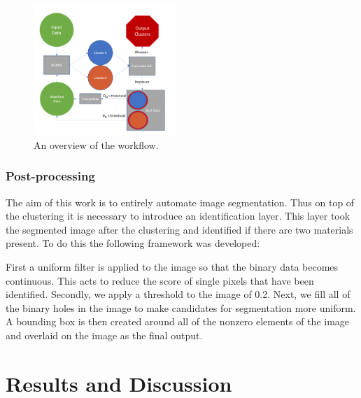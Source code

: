 \documentclass[a4paper,11pt]{article}
\begin{document}
\begin{figure}
  
  \begin{center}
    \includegraphics[width=0.48\textwidth]{figures/algo_flow.png}
  \end{center}
  
    \caption{An overview of the workflow.}
  
  \label{algo_flow}
\end{figure}

\subsubsection{Post-processing}

The aim of this work is to entirely automate image segmentation. Thus on top of the clustering it is necessary to introduce an identification layer. This layer took the segmented image after the clustering and identified if there are two materials present. To do this the following framework was developed:

First a uniform filter is applied to the image so that the binary data becomes continuous. This acts to reduce the score of single pixels that have been identified. Secondly, we apply a threshold to the image of 0.2. Next, we fill all of the binary holes in the image to make candidates for segmentation more uniform. A bounding box is then created around all of the nonzero elements of the image and overlaid on the image as the final output.





\section{Results and Discussion}
\end{document}
